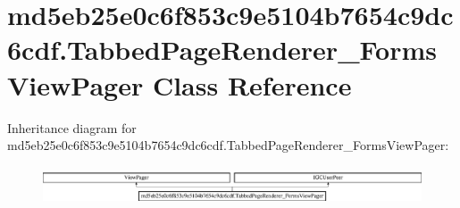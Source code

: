 \hypertarget{classmd5eb25e0c6f853c9e5104b7654c9dc6cdf_1_1TabbedPageRenderer__FormsViewPager}{}\section{md5eb25e0c6f853c9e5104b7654c9dc6cdf.\+Tabbed\+Page\+Renderer\+\_\+\+Forms\+View\+Pager Class Reference}
\label{classmd5eb25e0c6f853c9e5104b7654c9dc6cdf_1_1TabbedPageRenderer__FormsViewPager}
Inheritance diagram for md5eb25e0c6f853c9e5104b7654c9dc6cdf.\+Tabbed\+Page\+Renderer\+\_\+\+Forms\+View\+Pager\+:\begin{figure}[H]
\begin{center}
\leavevmode
\includegraphics[height=1.135903cm]{classmd5eb25e0c6f853c9e5104b7654c9dc6cdf_1_1TabbedPageRenderer__FormsViewPager}
\end{center}
\end{figure}
